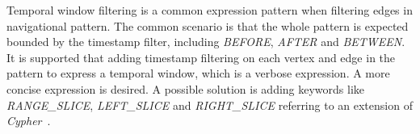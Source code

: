 
Temporal window filtering is a common expression pattern when filtering edges in
navigational pattern. The common scenario is that the whole pattern is expected
bounded by the timestamp filter, including \emph{BEFORE}, \emph{AFTER} and
\emph{BETWEEN}. It is supported that adding timestamp filtering on each vertex
and edge in the pattern to express a temporal window, which is a verbose
expression. A more concise expression is desired. A possible solution is adding
keywords like \emph{RANGE\_SLICE}, \emph{LEFT\_SLICE} and \emph{RIGHT\_SLICE}
referring to an extension of \emph{Cypher}~\cite{tcypher}.


